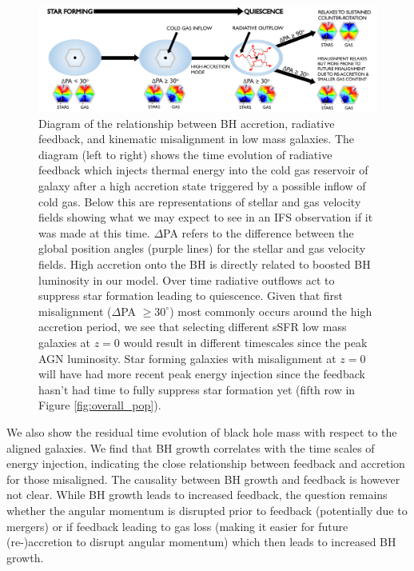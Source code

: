 \documentclass[fleqn,usenatbib]{mnras}
\begin{document}
\begin{figure}
	\includegraphics[width=0.9\linewidth]{quasar_mode_feedback_compressed.pdf}
    \caption{Diagram of the relationship between BH accretion, radiative feedback, and kinematic misalignment in low mass galaxies. The diagram (left to right) shows the time evolution of radiative feedback which injects thermal energy into the cold gas reservoir of galaxy after a high accretion state triggered by a possible inflow of cold gas. Below this are representations of stellar and gas velocity fields showing what we may expect to see in an IFS observation if it was made at this time. $\Delta$PA refers to the difference between the global position angles (purple lines) for the stellar and gas velocity fields. High accretion onto the BH is directly related to boosted BH luminosity in our model. Over time radiative outflows act to suppress star formation leading to quiescence. Given that first misalignment ($\Delta$PA $\geq 30^{\circ}$) most commonly occurs around the high accretion period, we see that selecting different sSFR low mass galaxies at $z=0$ would result in different timescales since the peak AGN luminosity. Star forming galaxies with misalignment at $z=0$ will have had more recent peak energy injection since the feedback hasn't had time to fully suppress star formation yet (fifth row in Figure \ref{fig:overall_pop}).}
    \label{fig:diagram}
\end{figure}

We also show the residual time evolution of black hole mass with respect to the aligned galaxies. We find that BH growth correlates with the time scales of energy injection, indicating the close relationship between feedback and accretion for those misaligned. The causality between BH growth and feedback is however not clear. While BH growth leads to increased feedback, the question remains whether the angular momentum is disrupted prior to feedback (potentially due to mergers) or if feedback leading to gas loss (making it easier for future (re-)accretion to disrupt angular momentum) which then leads to increased BH growth.
\end{document}
